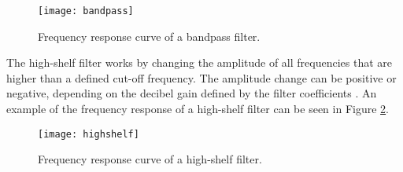 \begin{figure}
\centering
\texttt{[image: bandpass]}
\caption{Frequency response curve of a bandpass filter.}
\label{fig:bandpass}
\end{figure}

The high-shelf filter works by changing the amplitude of all frequencies that are higher than a defined cut-off frequency. The amplitude change can be positive or negative, depending on the decibel gain defined by the filter coefficients \cite{zolzer2011dafx}. An example of the frequency response of a high-shelf filter can be seen in Figure \ref{fig:highshelf}.

\begin{figure}
\centering
\texttt{[image: highshelf]}
\caption{Frequency response curve of a high-shelf filter.}
\label{fig:highshelf}
\end{figure}

	

